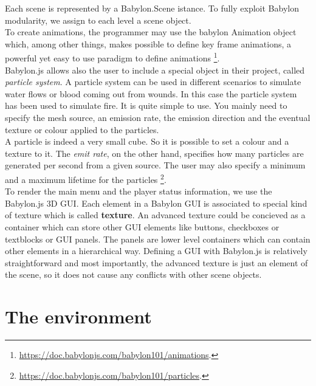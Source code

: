 \documentclass[14pt]{article}
\begin{document}
Each scene is represented by a Babylon.Scene istance. To fully exploit Babylon modularity, we assign to each level a scene object.\\
To create animations, the programmer may use the babylon Animation object which, among other things, makes possible to define key frame animations, a powerful yet easy to use paradigm to define animations \footnote{\url{https://doc.babylonjs.com/babylon101/animations}.}. \\
Babylon.js allows also the user to include a special object in their project, called \textit{particle system}. A particle system can be used in different scenarios to simulate water flows or blood coming out from wounds. In this case the particle system has been used to simulate fire. It is quite simple to use. You mainly need to specify the mesh source, an emission rate, the emission direction and the eventual texture or colour applied to the particles.\\
A particle is indeed a very small cube. So it is possible to set a colour and a texture to it. The \textit{emit rate}, on the other hand, specifies how many particles are generated per second from a given source. The user may also specify a minimum and a maximum lifetime for the particles 
\footnote{\url{https://doc.babylonjs.com/babylon101/particles}.}.\\

To render the main menu and the player status information, we use the Babylon.js 3D GUI. Each element in a Babylon GUI is associated to special kind of texture which is called \textbf{ texture}. An advanced texture could be concieved as a container which can store other GUI elements like buttons, checkboxes or textblocks or GUI panels. The panels are lower level containers which can contain other elements in a hierarchical way. Defining a GUI with Babylon.js is relatively straightforward and most importantly, the advanced texture is just an element of the scene, so it does not cause any conflicts with other scene objects.\\

\section{The environment}
\end{document}
